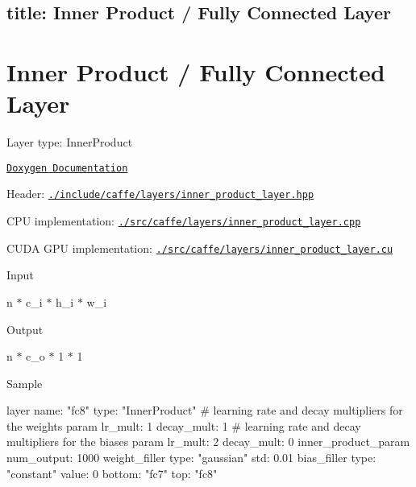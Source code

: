 

 \subsection*{title\+: Inner Product / Fully Connected Layer }

\section*{Inner Product / Fully Connected Layer}


\begin{DoxyItemize}
\item Layer type\+: {\ttfamily Inner\+Product}
\item \href{http://caffe.berkeleyvision.org/doxygen/classcaffe_1_1InnerProductLayer.html}{\tt Doxygen Documentation}
\item Header\+: \href{https://github.com/BVLC/caffe/blob/master/include/caffe/layers/inner_product_layer.hpp}{\tt {\ttfamily ./include/caffe/layers/inner\+\_\+product\+\_\+layer.hpp}}
\item C\+PU implementation\+: \href{https://github.com/BVLC/caffe/blob/master/src/caffe/layers/inner_product_layer.cpp}{\tt {\ttfamily ./src/caffe/layers/inner\+\_\+product\+\_\+layer.cpp}}
\item C\+U\+DA G\+PU implementation\+: \href{https://github.com/BVLC/caffe/blob/master/src/caffe/layers/inner_product_layer.cu}{\tt {\ttfamily ./src/caffe/layers/inner\+\_\+product\+\_\+layer.cu}}
\item Input
\begin{DoxyItemize}
\item {\ttfamily n $\ast$ c\+\_\+i $\ast$ h\+\_\+i $\ast$ w\+\_\+i}
\end{DoxyItemize}
\item Output
\begin{DoxyItemize}
\item {\ttfamily n $\ast$ c\+\_\+o $\ast$ 1 $\ast$ 1}
\end{DoxyItemize}
\item Sample \begin{DoxyVerb}layer {
  name: "fc8"
  type: "InnerProduct"
  # learning rate and decay multipliers for the weights
  param { lr_mult: 1 decay_mult: 1 }
  # learning rate and decay multipliers for the biases
  param { lr_mult: 2 decay_mult: 0 }
  inner_product_param {
    num_output: 1000
    weight_filler {
      type: "gaussian"
      std: 0.01
    }
    bias_filler {
      type: "constant"
      value: 0
    }
  }
  bottom: "fc7"
  top: "fc8"
}
\end{DoxyVerb}

\end{DoxyItemize}

